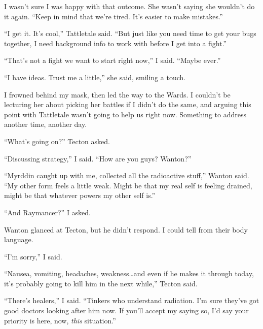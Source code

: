 I wasn't sure I was happy with that outcome.  She wasn't saying she wouldn't do it again.  ``Keep in mind that we're tired.  It's easier to make mistakes.''



``I get it.  It's cool,'' Tattletale said.  ``But just like you need time to get your bugs together, I need background info to work with before I get into a fight.''



``That's not a fight we want to start right now,'' I said.  ``Maybe ever.''



``I have ideas.  Trust me a little,'' she said, smiling a touch.



I frowned behind my mask, then led the way to the Wards.  I couldn't be lecturing her about picking her battles if I didn't do the same, and arguing this point with Tattletale wasn't going to help us right now.  Something to address another time, another day.



``What's going on?'' Tecton asked.



``Discussing strategy,'' I said.  ``How are you guys?  Wanton?''



``Myrddin caught up with me, collected all the radioactive stuff,'' Wanton said.  ``My other form feels a little weak.  Might be that my real self is feeling drained, might be that whatever powers my other self is.''



``And Raymancer?'' I asked.



Wanton glanced at Tecton, but he didn't respond.  I could tell from their body language.



``I'm sorry,'' I said.



``Nausea, vomiting, headaches, weakness\ldots and even if he makes it through today, it's probably going to kill him in the next while,'' Tecton said.



``There's healers,'' I said.  ``Tinkers who understand radiation.  I'm sure they've got good doctors looking after him now.  If you'll accept my saying so, I'd say your priority is here, now, \emph{this} situation.''



